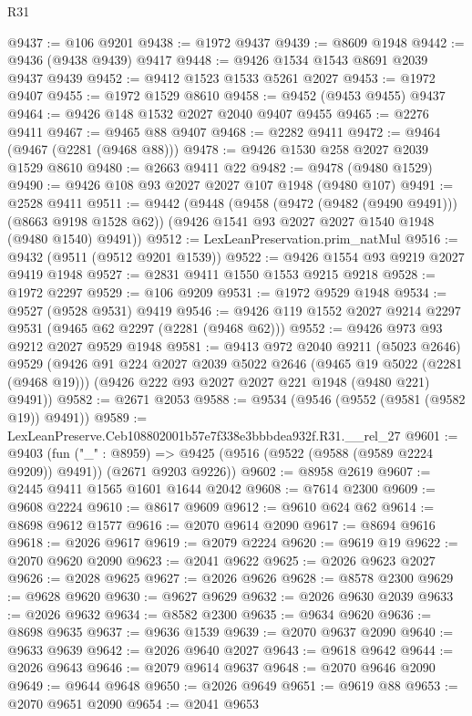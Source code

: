 \begin{lexlean}{R31}
\begin{coremodule}
@9437 := @106 @9201
@9438 := @1972 @9437
@9439 := @8609 @1948
@9442 := @9436 (@9438 @9439) @9417
@9448 := @9426 @1534 @1543 @8691 @2039 @9437 @9439
@9452 := @9412 @1523 @1533 @5261 @2027
@9453 := @1972 @9407
@9455 := @1972 @1529 @8610
@9458 := @9452 (@9453 @9455) @9437
@9464 := @9426 @148 @1532 @2027 @2040 @9407 @9455
@9465 := @2276 @9411
@9467 := @9465 @88 @9407
@9468 := @2282 @9411
@9472 := @9464 (@9467 (@2281 (@9468 @88)))
@9478 := @9426 @1530 @258 @2027 @2039 @1529 @8610
@9480 := @2663 @9411 @22
@9482 := @9478 (@9480 @1529)
@9490 := @9426 @108 @93 @2027 @2027 @107 @1948 (@9480 @107)
@9491 := @2528 @9411
@9511 := @9442
    (@9448
      (@9458 (@9472 (@9482 (@9490 @9491))) (@8663 @9198 @1528 @62))
      (@9426 @1541 @93 @2027 @2027 @1540 @1948 (@9480 @1540) @9491))
@9512 := LexLeanPreservation.prim_natMul
@9516 := @9432 (@9511 (@9512 @9201 @1539))
@9522 := @9426 @1554 @93 @9219 @2027 @9419 @1948
@9527 := @2831 @9411 @1550 @1553 @9215 @9218
@9528 := @1972 @2297
@9529 := @106 @9209
@9531 := @1972 @9529 @1948
@9534 := @9527 (@9528 @9531) @9419
@9546 := @9426 @119 @1552 @2027 @9214 @2297 @9531 (@9465 @62 @2297 (@2281 (@9468 @62)))
@9552 := @9426 @973 @93 @9212 @2027 @9529 @1948
@9581 := @9413
    @972
    @2040
    @9211
    (@5023 @2646)
    @9529
    (@9426
      @91
      @224
      @2027
      @2039
      @5022
      @2646
      (@9465 @19 @5022 (@2281 (@9468 @19)))
      (@9426 @222 @93 @2027 @2027 @221 @1948 (@9480 @221) @9491))
@9582 := @2671 @2053
@9588 := @9534 (@9546 (@9552 (@9581 (@9582 @19)) @9491))
@9589 := LexLeanPreserve.Ceb108802001b57e7f338e3bbbdea932f.R31.__rel_27
@9601 := @9403
    (fun ("_" : @8959) =>
    @9425 (@9516 (@9522 (@9588 (@9589 @2224 @9209)) @9491)) (@2671 @9203 @9226))
@9602 := @8958 @2619
@9607 := @2445 @9411 @1565 @1601 @1644 @2042
@9608 := @7614 @2300
@9609 := @9608 @2224
@9610 := @8617 @9609
@9612 := @9610 @624 @62
@9614 := @8698 @9612 @1577
@9616 := @2070 @9614 @2090
@9617 := @8694 @9616
@9618 := @2026 @9617
@9619 := @2079 @2224
@9620 := @9619 @19
@9622 := @2070 @9620 @2090
@9623 := @2041 @9622
@9625 := @2026 @9623 @2027
@9626 := @2028 @9625
@9627 := @2026 @9626
@9628 := @8578 @2300
@9629 := @9628 @9620
@9630 := @9627 @9629
@9632 := @2026 @9630 @2039
@9633 := @2026 @9632
@9634 := @8582 @2300
@9635 := @9634 @9620
@9636 := @8698 @9635
@9637 := @9636 @1539
@9639 := @2070 @9637 @2090
@9640 := @9633 @9639
@9642 := @2026 @9640 @2027
@9643 := @9618 @9642
@9644 := @2026 @9643
@9646 := @2079 @9614 @9637
@9648 := @2070 @9646 @2090
@9649 := @9644 @9648
@9650 := @2026 @9649
@9651 := @9619 @88
@9653 := @2070 @9651 @2090
@9654 := @2041 @9653

\end{coremodule}
\end{lexlean}

